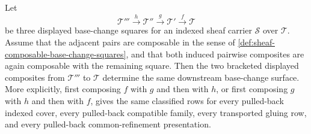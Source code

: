 \begin{theorem}
\label{thm:sheaf-base-change-three-square-associativity}
Let
$$
\mathcal{T}'''\xrightarrow{h}\mathcal{T}''\xrightarrow{g}\mathcal{T}'\xrightarrow{f}\mathcal{T}
$$
be three displayed base-change squares for an indexed sheaf carrier $\mathcal{S}$ over $\mathcal{T}$. Assume that the adjacent pairs are composable in the sense of \autoref{def:sheaf-composable-base-change-squares}, and that both induced pairwise composites are again composable with the remaining square. Then the two bracketed displayed composites from $\mathcal{T}'''$ to $\mathcal{T}$ determine the same downstream base-change surface. More explicitly, first composing $f$ with $g$ and then with $h$, or first composing $g$ with $h$ and then with $f$, gives the same classified rows for every pulled-back indexed cover, every pulled-back compatible family, every transported gluing row, and every pulled-back common-refinement presentation.
\end{theorem}
